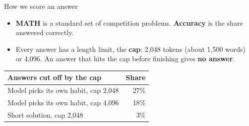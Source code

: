 \documentclass[aspectratio=169,11pt]{beamer}
\begin{document}
\begin{frame}{How we score an answer}
  \vspace{0.2em}
  \begin{center}
  \end{center}
  \vspace{0.3em}
  \small
  \begin{itemize}\setlength\itemsep{0.3em}
    \item \textbf{MATH} is a standard set of competition problems. \textbf{Accuracy} is the share answered correctly.
    \item Every answer has a length limit, the \textbf{cap}: 2{,}048 tokens (about 1{,}500 words) or 4{,}096.
      An answer that hits the cap before finishing gives \textbf{no answer}.
  \end{itemize}
  \vspace{0.2em}
  \begin{center}
  \begin{tabular}{@{}l r@{}}
    \toprule
    \textbf{Answers cut off by the cap} & \textbf{Share} \\
    \midrule
    Model picks its own habit, cap 2{,}048 & 27\% \\
    Model picks its own habit, cap 4{,}096 & 18\% \\
    Short solution, cap 2{,}048 & 3\% \\
    \bottomrule
  \end{tabular}
  \end{center}
\end{frame}
\end{document}
